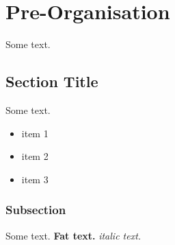 \chapter{Pre-Organisation}
Some text.

\section{Section Title}
Some text.

\begin{itemize}
    \item item 1
    \item item 2
    \item item 3
\end{itemize}

\subsection{Subsection}
Some text. \textbf{Fat text.} \textit{italic text.}
